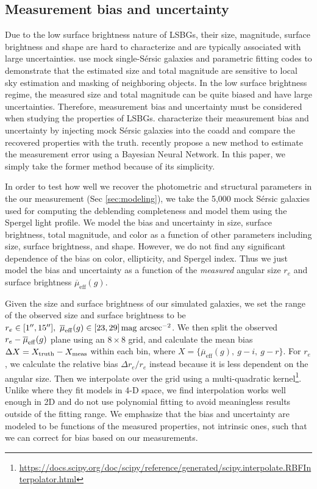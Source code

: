 \documentclass[twocolumn,astrosymb,twocolappendix]{aastex631}
\newcommand{\sbunit}{\mathrm{mag\ arcsec}^{-2}}
\newcommand{\sbeff}{\overline{\mu}_{\mathrm{eff}}(g)}
\newcommand{\sersic}{S\'ersic}
\begin{document}
\begin{CJK*}{UTF8}{gbsn}
\subsection{Measurement bias and uncertainty}\label{sec:meas_unc}

Due to the low surface brightness nature of LSBGs, their size, magnitude, surface brightness and shape are hard to characterize and are typically associated with large uncertainties. \citet{Haussler2007} use mock single-\sersic{} galaxies and parametric fitting codes to demonstrate that the estimated size and total magnitude are sensitive to local sky estimation and masking of neighboring objects. In the low surface brightness regime, the measured size and total magnitude can be quite biased and have large uncertainties. Therefore, measurement bias and uncertainty must be considered when studying the properties of LSBGs. \citet{Zaritsky2021,Zaritsky2022} characterize their measurement bias and uncertainty by injecting mock \sersic{} galaxies into the coadd and compare the recovered properties with the truth. \citet{Tanoglidis2022ICML} recently propose a new method to estimate the measurement error using a Bayesian Neural Network. In this paper, we simply take the former method because of its simplicity. 

In order to test how well we recover the photometric and structural parameters in the our measurement (Sec \ref{sec:modeling}), we take the 5,000 mock \sersic{} galaxies used for computing the deblending completeness and model them using the Spergel light profile. We model the bias and uncertainty in size, surface brightness, total magnitude, and color as a function of other parameters including size, surface brightness, and shape. However, we do not find any significant dependence of the bias on color, ellipticity, and Spergel index. Thus we just model the bias and uncertainty as a function of the \textit{measured} angular size $r_e$ and surface brightness $\sbeff$.

Given the size and surface brightness of our simulated galaxies, we set the range of the observed size and surface brightness to be $r_e\in[1\arcsec, 15\arcsec],\ \sbeff\in[23, 29]\,\sbunit$. We then split the observed $r_e-\overline{\mu}_{\rm eff}(g)$ plane using an $8\times 8$ grid, and calculate the mean bias $\Delta X = X_{\rm truth} - X_{\rm meas}$ within each bin, where $X=\{\sbeff,\ g-i,\ g-r\}$. For $r_e$, we calculate the relative bias $\Delta r_e / r_e$ instead because it is less dependent on the angular size. Then we interpolate over the grid using a multi-quadratic kernel\footnote{\url{https://docs.scipy.org/doc/scipy/reference/generated/scipy.interpolate.RBFInterpolator.html}}. Unlike \citet{Zaritsky2021} where they fit models in 4-D space, we find interpolation works well enough in 2D and do not use polynomial fitting to avoid meaningless results outside of the fitting range. We emphasize that the bias and uncertainty are modeled to be functions of the measured properties, not intrinsic ones, such that we can correct for bias based on our measurements. 


\end{CJK*}
\end{document}
